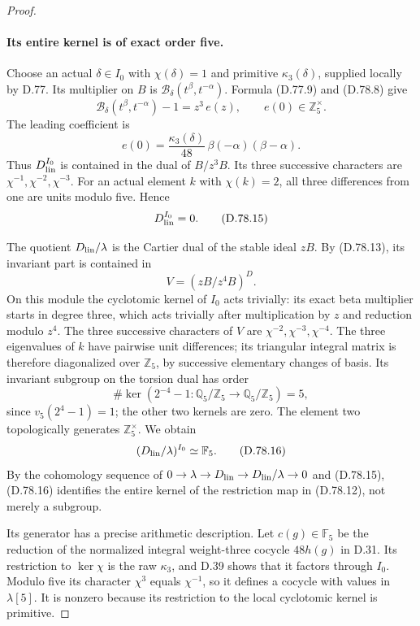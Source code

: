 \begin{proof}
\paragraph{Its entire kernel is of exact order five.}
Choose an actual \(\delta\in I_0\) with \(\chi(\delta)=1\)
and primitive \(\kappa_3(\delta)\), supplied locally by D.77.
Its multiplier on \(B\) is \(\mathcal B_\delta(t^\beta,t^{-\alpha})\).
Formula (D.77.9) and (D.78.8) give
\[
 \mathcal B_\delta(t^\beta,t^{-\alpha})-1
      =z^3\,e(z),\qquad e(0)\in\mathbb Z_5^\times .
                                                               \tag{D.78.13}
\]
The leading coefficient is
\[
 e(0)=\frac{\kappa_3(\delta)}{48}\,
                     \beta(-\alpha)(\beta-\alpha).
                                                               \tag{D.78.14}
\]
Thus \(D_{\rm lin}^{I_0}\) is contained in the dual of
\(B/z^3B\). Its three successive characters are
\(\chi^{-1},\chi^{-2},\chi^{-3}\). For an actual element
\(k\) with \(\chi(k)=2\), all three differences from one
are units modulo five. Hence
\[
                         D_{\rm lin}^{I_0}=0.           \tag{D.78.15}
\]

The quotient \(D_{\rm lin}/\lambda\) is the Cartier dual
of the stable ideal \(zB\). By (D.78.13), its invariant
part is contained in
\[
                       V=(zB/z^4B)^D.
 \]
On this module the cyclotomic kernel of \(I_0\) acts
trivially: its exact beta multiplier starts in degree
three, which acts trivially after multiplication by \(z\)
and reduction modulo \(z^4\). The three successive
characters of \(V\) are
\(\chi^{-2},\chi^{-3},\chi^{-4}\).
The three eigenvalues of \(k\) have pairwise unit
differences; its triangular integral matrix is therefore
diagonalized over \(\mathbb Z_5\), by successive elementary
changes of basis. Its invariant subgroup on the torsion
dual has order
\[
       \#\ker(2^{-4}-1:\mathbb Q_5/\mathbb Z_5
                         \to\mathbb Q_5/\mathbb Z_5)=5,
 \]
since \(v_5(2^4-1)=1\); the other two kernels are zero.
The element two topologically generates \(\mathbb Z_5^\times\).
We obtain
\[
                (D_{\rm lin}/\lambda)^{I_0}\simeq\mathbb F_5.
                                                               \tag{D.78.16}
\]
By the cohomology sequence of
\(0\to\lambda\to D_{\rm lin}\to D_{\rm lin}/\lambda\to0\)
and (D.78.15), (D.78.16) identifies the entire kernel of
the restriction map in (D.78.12), not merely a subgroup.

Its generator has a precise arithmetic description.
Let \(c(g)\in\mathbb F_5\) be the reduction of the normalized
integral weight-three cocycle \(48h(g)\) in D.31.
Its restriction to \(\ker\chi\) is the raw \(\kappa_3\),
and D.39 shows that it factors through \(I_0\).
Modulo five its character \(\chi^3\) equals \(\chi^{-1}\),
so it defines a cocycle with values in \(\lambda[5]\).
It is nonzero because its restriction to the local
cyclotomic kernel is primitive.


\end{proof}
